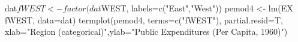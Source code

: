\begin{Schunk}
\begin{Sinput}
 dat$fWEST <- factor(dat$WEST, labels=c("East","West")) 
 pemod4 <- lm(EX ~ fWEST, data=dat)
 termplot(pemod4, terms=c("fWEST"), partial.resid=T, xlab="Region (categorical)",ylab="Public Expenditures (Per Capita, 1960)")
\end{Sinput}
\end{Schunk}
